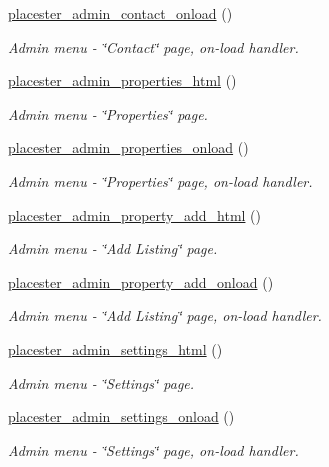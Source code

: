 \begin{DoxyCompactItemize}
\hyperlink{admin_2init_8php_ae1fece6fc600e4c002e746dfc2ade258}{placester\_\-admin\_\-contact\_\-onload} ()
\begin{DoxyCompactList}\small\item\em Admin menu -\/ \char`\"{}Contact\char`\"{} page, on-\/load handler. \end{DoxyCompactList}\item 
\hyperlink{admin_2init_8php_a01b7bc4fafe7486550e5cb9f6b495b56}{placester\_\-admin\_\-properties\_\-html} ()
\begin{DoxyCompactList}\small\item\em Admin menu -\/ \char`\"{}Properties\char`\"{} page. \end{DoxyCompactList}\item 
\hyperlink{admin_2init_8php_ae7deb9f71097344b8af4962dbd7cbabd}{placester\_\-admin\_\-properties\_\-onload} ()
\begin{DoxyCompactList}\small\item\em Admin menu -\/ \char`\"{}Properties\char`\"{} page, on-\/load handler. \end{DoxyCompactList}\item 
\hyperlink{admin_2init_8php_ab6e750323ba29e87b61073b4df2c0172}{placester\_\-admin\_\-property\_\-add\_\-html} ()
\begin{DoxyCompactList}\small\item\em Admin menu -\/ \char`\"{}Add Listing\char`\"{} page. \end{DoxyCompactList}\item 
\hyperlink{admin_2init_8php_af2ca5d6b0bc4647165b407ae0594642c}{placester\_\-admin\_\-property\_\-add\_\-onload} ()
\begin{DoxyCompactList}\small\item\em Admin menu -\/ \char`\"{}Add Listing\char`\"{} page, on-\/load handler. \end{DoxyCompactList}\item 
\hyperlink{admin_2init_8php_aea415413ac311dfa2947357a450644fe}{placester\_\-admin\_\-settings\_\-html} ()
\begin{DoxyCompactList}\small\item\em Admin menu -\/ \char`\"{}Settings\char`\"{} page. \end{DoxyCompactList}\item 
\hyperlink{admin_2init_8php_a489480fc676bd563ef525e727663061a}{placester\_\-admin\_\-settings\_\-onload} ()
\begin{DoxyCompactList}\small\item\em Admin menu -\/ \char`\"{}Settings\char`\"{} page, on-\/load handler. \end{DoxyCompactList}\item 

\end{DoxyCompactItemize}
